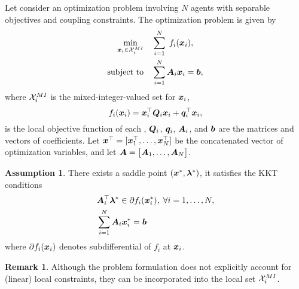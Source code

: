 \documentclass[twocolumn,amsthm]{autart}%
\theoremstyle{definition}
\newtheorem{assumption}{Assumption}
\newtheorem{definition}{Definition}
\newtheorem{remark}{Remark}
\theoremstyle{plain}
\begin{document}
Let consider an optimization problem involving $N$ agents with separable objectives and coupling constraints.
The optimization problem is given by
\begin{equation}
\begin{split}
\underset{\boldsymbol{x}_i \in \mathcal{X}_i^{\relax{MI}}}{\min} & \quad \sum_{i=1}^N \; f_i (\boldsymbol{x}_i), \\
\text{subject to} & \quad \sum_{i=1}^N \boldsymbol{A}_{i} \boldsymbol{x}_i = \boldsymbol{b}, \\
\end{split}
\end{equation}
where $\mathcal{X}_i^{\relax{MI}}$ is the mixed-integer-valued set for $\boldsymbol{x}_i$,
\[
f_i (\boldsymbol{x}_i) = \boldsymbol{x}_i^\top \boldsymbol{Q}_i \boldsymbol{x}_i + \boldsymbol{q}_i^\top \boldsymbol{x}_i,
\]
is the local objective function of each ,
$\boldsymbol{Q}_i$, $\boldsymbol{q}_i$, $\boldsymbol{A}_{i}$, and $\boldsymbol{b}$ are the matrices and vectors of coefficients.
Let $\boldsymbol{x}^\top = [\boldsymbol{x}_1^\top, \dots, \boldsymbol{x}_N^\top]$ be the concatenated vector of optimization variables, and let
$\boldsymbol{A} = \big[ \boldsymbol{A}_1, \dots, \boldsymbol{A}_N \big]$.


\begin{assumption}
There exists a saddle point $(\boldsymbol{x}^{*}, \boldsymbol{\lambda}^{*})$, \ie it satisfies the KKT conditions
\begin{equation}
\begin{split}
& \boldsymbol{A}_i^\top \boldsymbol{\lambda}^{*} \in \partial f_i(\boldsymbol{x}_i^{*}),\; \forall i = 1, \dots, N, \\
& \sum_{i=1}^N \boldsymbol{A}_{i} \boldsymbol{x}^{*}_i = \boldsymbol{b}
\end{split}
\end{equation}
where $\partial f_i(\boldsymbol{x}_i)$ denotes subdifferential of $f_i$ at $\boldsymbol{x}_i$.
\end{assumption}

  
\begin{remark}
Although the problem formulation does not explicitly account for (linear) local constraints, they can be incorporated into the local set $\mathcal{X}_i^{\relax{MI}}$. 
\end{remark}

\end{document}
